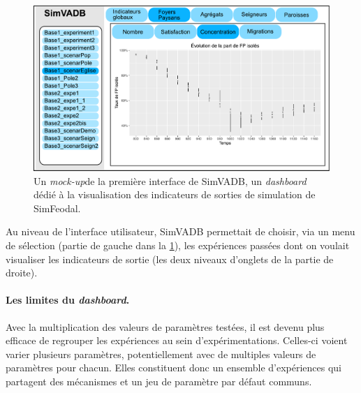 \begin{figure}[H]
	\centering
	\includegraphics[width=\linewidth]{img/simvadb_mockup.pdf}
	\caption[Première interface de SimVADB, un \textit{dashboard} dédié à la visualisation des indicateurs de sorties de simulation de SimFeodal.]{Un \textit{mock-up}\footnotemark de la première interface de SimVADB, un \textit{dashboard} dédié à la visualisation des indicateurs de sorties de simulation de SimFeodal.}
	\label{fig:mockup_simvadb}
\end{figure}

Au niveau de l'interface utilisateur, SimVADB permettait de choisir, via un menu de sélection (partie de gauche dans la \cref{fig:mockup_simvadb}), les expériences passées dont on voulait visualiser les indicateurs de sortie (les deux niveaux d'onglets de la partie de droite).


\paragraph{Les limites du \textit{dashboard}.}
Avec la multiplication des valeurs de paramètres testées, il est devenu plus efficace de regrouper les expériences au sein d'expérimentations.
Celles-ci voient varier plusieurs paramètres, potentiellement avec de multiples valeurs de paramètres pour chacun.
Elles constituent donc un ensemble d'expériences qui partagent des mécanismes et un jeu de paramètre par défaut communs.

